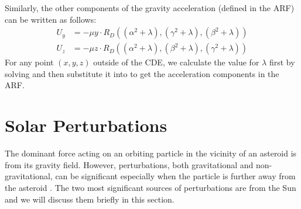 Similarly, the other components of the gravity acceleration (defined in the \gls{ARF}) can be written as follows:
\begin{align}
    U_y &= -\mu y \cdotp R_D((\alpha^2 + \lambda), (\gamma^2 + \lambda), (\beta^2 + \lambda))
    \label{eqn:grav_acc_y_carlson} \\
    U_z &= -\mu z \cdotp R_D((\alpha^2 + \lambda), (\beta^2 + \lambda), (\gamma^2 + \lambda))
    \label{eqn:grav_acc_z_carlson}
\end{align}
For any point $(x,y,z)$ outside of the \gls{CDE}, we calculate the value for $\lambda$ first by solving  and then substitute it into  to get the acceleration components in the \gls{ARF}.

\section{Solar Perturbations}
\label{sec:solar_perturbations}
The dominant force acting on an orbiting particle in the vicinity of an asteroid is from its gravity field. However, perturbations, both gravitational and non-gravitational, can be significant especially when the particle is further away from the asteroid \parencite{scheeresBook}. The two most significant sources of perturbations are from the Sun and we will discuss them briefly in this section.

